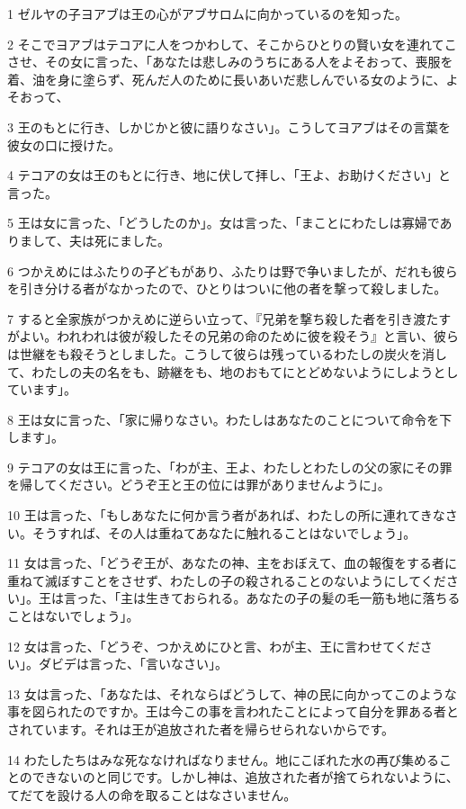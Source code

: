 \par 1 ゼルヤの子ヨアブは王の心がアブサロムに向かっているのを知った。
\par 2 そこでヨアブはテコアに人をつかわして、そこからひとりの賢い女を連れてこさせ、その女に言った、「あなたは悲しみのうちにある人をよそおって、喪服を着、油を身に塗らず、死んだ人のために長いあいだ悲しんでいる女のように、よそおって、
\par 3 王のもとに行き、しかじかと彼に語りなさい」。こうしてヨアブはその言葉を彼女の口に授けた。
\par 4 テコアの女は王のもとに行き、地に伏して拝し、「王よ、お助けください」と言った。
\par 5 王は女に言った、「どうしたのか」。女は言った、「まことにわたしは寡婦でありまして、夫は死にました。
\par 6 つかえめにはふたりの子どもがあり、ふたりは野で争いましたが、だれも彼らを引き分ける者がなかったので、ひとりはついに他の者を撃って殺しました。
\par 7 すると全家族がつかえめに逆らい立って、『兄弟を撃ち殺した者を引き渡たすがよい。われわれは彼が殺したその兄弟の命のために彼を殺そう』と言い、彼らは世継をも殺そうとしました。こうして彼らは残っているわたしの炭火を消して、わたしの夫の名をも、跡継をも、地のおもてにとどめないようにしようとしています」。
\par 8 王は女に言った、「家に帰りなさい。わたしはあなたのことについて命令を下します」。
\par 9 テコアの女は王に言った、「わが主、王よ、わたしとわたしの父の家にその罪を帰してください。どうぞ王と王の位には罪がありませんように」。
\par 10 王は言った、「もしあなたに何か言う者があれば、わたしの所に連れてきなさい。そうすれば、その人は重ねてあなたに触れることはないでしょう」。
\par 11 女は言った、「どうぞ王が、あなたの神、主をおぼえて、血の報復をする者に重ねて滅ぼすことをさせず、わたしの子の殺されることのないようにしてください」。王は言った、「主は生きておられる。あなたの子の髪の毛一筋も地に落ちることはないでしょう」。
\par 12 女は言った、「どうぞ、つかえめにひと言、わが主、王に言わせてください」。ダビデは言った、「言いなさい」。
\par 13 女は言った、「あなたは、それならばどうして、神の民に向かってこのような事を図られたのですか。王は今この事を言われたことによって自分を罪ある者とされています。それは王が追放された者を帰らせられないからです。
\par 14 わたしたちはみな死ななければなりません。地にこぼれた水の再び集めることのできないのと同じです。しかし神は、追放された者が捨てられないように、てだてを設ける人の命を取ることはなさいません。
